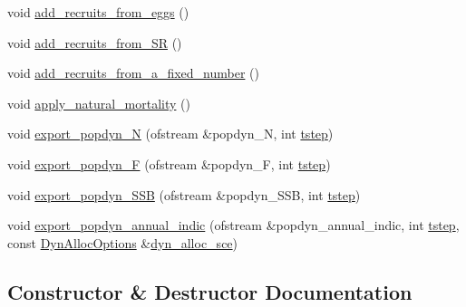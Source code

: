 \begin{DoxyCompactItemize}
\item 
void \mbox{\hyperlink{class_population_a9fb81b9aa9174083b46850b86414385f}{add\+\_\+recruits\+\_\+from\+\_\+eggs}} ()
\item 
void \mbox{\hyperlink{class_population_a2442fa5a3dc6f5220f3a1ae28e25c29c}{add\+\_\+recruits\+\_\+from\+\_\+\+SR}} ()
\item 
void \mbox{\hyperlink{class_population_ae74135dea99ae62bf197d28126ee17a9}{add\+\_\+recruits\+\_\+from\+\_\+a\+\_\+fixed\+\_\+number}} ()
\item 
void \mbox{\hyperlink{class_population_af9cd47dc018969d1ff738f96f298b3c9}{apply\+\_\+natural\+\_\+mortality}} ()
\item 
void \mbox{\hyperlink{class_population_ac3adee0c049e09e744bdfbf9e8e239c9}{export\+\_\+popdyn\+\_\+N}} (ofstream \&popdyn\+\_\+N, int \mbox{\hyperlink{thread__vessels_8cpp_a84bc73d278de929ec9974e1a95d9b23a}{tstep}})
\item 
void \mbox{\hyperlink{class_population_a73a285cf9f2d242a571990c9bef1d565}{export\+\_\+popdyn\+\_\+F}} (ofstream \&popdyn\+\_\+F, int \mbox{\hyperlink{thread__vessels_8cpp_a84bc73d278de929ec9974e1a95d9b23a}{tstep}})
\item 
void \mbox{\hyperlink{class_population_a6bc9eb96686a050e5c02f6a976c28542}{export\+\_\+popdyn\+\_\+\+S\+SB}} (ofstream \&popdyn\+\_\+\+S\+SB, int \mbox{\hyperlink{thread__vessels_8cpp_a84bc73d278de929ec9974e1a95d9b23a}{tstep}})
\item 
void \mbox{\hyperlink{class_population_ae73b0dda66c7b3c97521289f79e628aa}{export\+\_\+popdyn\+\_\+annual\+\_\+indic}} (ofstream \&popdyn\+\_\+annual\+\_\+indic, int \mbox{\hyperlink{thread__vessels_8cpp_a84bc73d278de929ec9974e1a95d9b23a}{tstep}}, const \mbox{\hyperlink{class_dyn_alloc_options}{Dyn\+Alloc\+Options}} \&\mbox{\hyperlink{thread__vessels_8cpp_a8389f6b9261a2039cabeecc230207043}{dyn\+\_\+alloc\+\_\+sce}})
\end{DoxyCompactItemize}


\subsection{Constructor \& Destructor Documentation}
\mbox{\label{class_population_a25d653ae9ea3b940e0df5b10d2d3213a}} 
